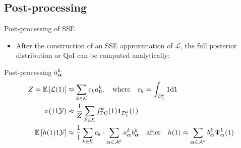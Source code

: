 \documentclass{rsuqbeamernew}
\newcommand{\BParams}{1}
\newcommand{\Bparams}{1}
\newcommand{\Bprior}{1}
\newcommand{\Bcond}{1}
\newcommand{\Bevi}{1}
\begin{document}
\subsection{Post-processing}
\begin{frame}[t]{Post-processing of SSE}
	\small
	\begin{itemize}
		\item[]After the construction of an SSE approximation of 
		$\mathcal{L}$, the full posterior distribution or QoI can be 
		computed analytically:
	\end{itemize}
	
	\begin{block}{Post-processing $a_{\boldsymbol{\alpha}}^k$}
		\begin{align*}
		Z = \Esp{\mathcal{L}(\BParams)}&\approx \sum_{k\in\mathcal{K}} 
		c_k a_{\ve{0}}^k, \quad 
		\text{where} 
		\quad 
		c_k = 
		\int_{\cd_{\BParams}^k}\Bprior\di{\Bparams} \\ 
		\pi(\Bparams\Bcond\cy) &\approx 
		\frac{\Bprior}{Z}\sum_{k\in\mathcal{K}}
		f_{\mathrm{PC}}^k(\Bparams)\ve{1}_{\cd_{\BParams}^k}(\Bparams)\\
		\Esp{h(\BParams)\Bcond\cy} &\approx 
		\frac{1}{\Bevi}\sum_{k\in\mathcal{K}}  c_k\cdot
		\sum_{\ve{\alpha}\in\ca^{k}}a_{\ve{\alpha}}^{k}
		b_{\ve{\alpha}}^{k}
		\quad \text{after} \quad h(\Bparams)\approx 
		\sum_{\ve{\alpha}\in\ca^k}
		b_{\ve{\alpha}}^k\Psi_{\ve{\alpha}}^k(\Bparams)
		\end{align*}
	\end{block}
\end{frame}

\end{document}

